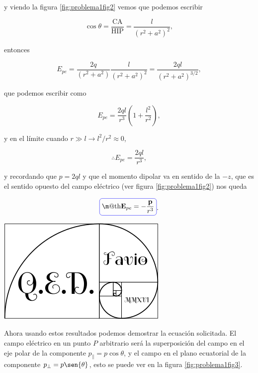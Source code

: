 \documentclass[a4paper,11pt]{article}
\makeatletter
\numberwithin{equation}{section}
\newcommand*{\boxcolor}{blue}
\renewcommand{\boxed}[1]{\textcolor{\boxcolor}{%
\tikz[baseline={([yshift=-1ex]current bounding box.center)}] \node [rectangle, minimum width=1ex,rounded corners,draw] {\normalcolor\m@th$\displaystyle#1$};}}
\makeatother
\begin{document}
y viendo la figura \eqref{fig:problema1fig2} vemos que podemos escribir 

\begin{equation}
 \cos{\theta} = \frac{\text{CA}}{\text{HIP}} = \frac{l}{(r^2+a^2)^2},
\end{equation}

entonces 

\begin{equation}
 E_{pe} = \frac{2q}{(r^2+a^2)} \frac{l}{(r^2+a^2)^2} = \frac{2ql}{(r^2+a^2)^{3/2}},
\end{equation}

que podemos escribir como 

\begin{equation}
 E_{pe} = \frac{2ql}{r^3}\left(1 + \frac{l^2}{r^2} \right),
\end{equation}

y en el límite cuando $r \gg l \rightarrow l^2/r^2 \approx 0$,

\begin{equation}
 \therefore E_{pe} = \frac{2ql}{r^3},
\end{equation}

y recordando que $p = 2ql$ y que el momento dipolar va en sentido de la $-z$, que 
es el sentido opuesto del campo eléctrico (ver figura \eqref{fig:problema1fig2}) nos queda 

\begin{equation}
 \boxed{\mathbf{E}_{pe} = - \frac{\mathbf{p}}{r^3}}.
 \label{eq:campoElecDipoloEcuador}
\end{equation}

\hspace{10cm}\includegraphics[scale=0.25]{logoQED}

\vspace{.2cm}

Ahora usando estos resultados podemos demostrar la ecuación solicitada. El campo 
eléctrico en un punto $P$ arbitrario será la superposición del campo en el eje polar 
de la componente $p_{\parallel} = p \cos{\theta}$, y el campo en el plano ecuatorial de la 
componente $p_{\bot} = p\sen{\theta}$, esto se puede ver en la figura 
\eqref{fig:problema1fig3}.
\end{document}
